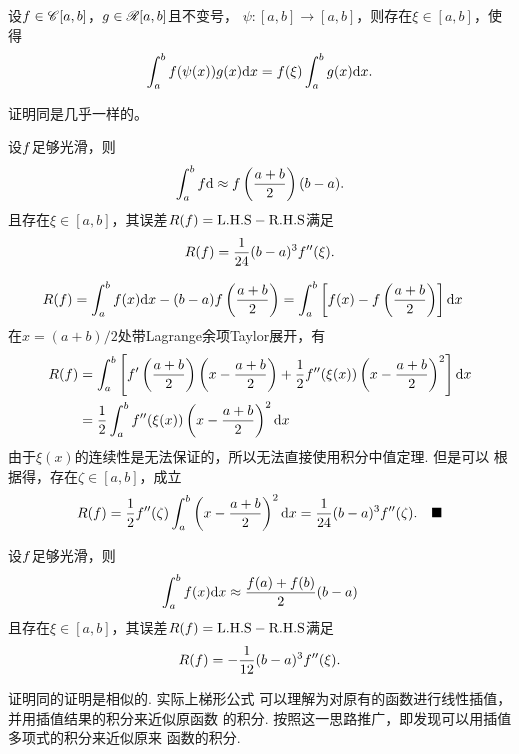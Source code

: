   \begin{pos}
    \label{pos: 积分第一中值定理2}
    设$\mathnormal{f}\in\mathscr{C}[a, b]$，$\mathnormal{g}\in\mathscr{R}[a, b]$且不变号，
    $\psi:[a, b]\to[a, b]$，则存在$\xi\in[a, b]$，使得
    \[
      \int_a^b\mathnormal{f}(\psi(x))\mathnormal{g}(x)\mathrm{d} x =
      \mathnormal{f}(\xi)\int_a^b\mathnormal{g}(x)\mathrm{d} x.
    \]
  \end{pos}
  \remark
    证明同是几乎一样的。

  \begin{pos}[中矩形公式]
    \label{pos: 中矩形公式}
    设$\mathnormal{f}$足够光滑，则
    \[
      \int_a^b\mathnormal{f}\mathrm{d} \approx \mathnormal{f}\left(\frac{a+b}{2}\right)(b-a).
    \]
    且存在$\xi\in[a, b]$，其误差$R(\mathnormal{f})=\text{L.H.S}-\text{R.H.S}$满足
    \[
      R(\mathnormal{f}) = \frac{1}{24}(b-a)^3\mathnormal{f}^{\prime\prime}(\xi).
    \]
  \end{pos}
  \proof
    \[\begin{split}
      R(\mathnormal{f}) &= \int_a^b\mathnormal{f}(x)\mathrm{d} x - (b-a)\mathnormal{f}\left( \frac{a+b}{2} \right) = \int_a^b \left[
        \mathnormal{f}(x) - \mathnormal{f}\left(\frac{a+b}{2}\right)
      \right]\mathrm{d} x
    \end{split}\]
    在$x = (a+b)/2$处带Lagrange余项Taylor展开，有
    \[\begin{split}
      R(\mathnormal{f}) &= \int_a^b\left[ \mathnormal{f}^\prime\left(\frac{a+b}{2}\right)\left(x - \frac{a+b}{2}\right)
       + \frac{1}{2}\mathnormal{f}^{\prime\prime}(\xi(x))\left(x - \frac{a+b}{2}\right)^2\right]\mathrm{d} x \\
       &= \frac{1}{2}\int_a^b\mathnormal{f}^{\prime\prime}(\xi(x))\left(x - \frac{a+b}{2}\right)^2\mathrm{d} x
    \end{split}\]
    由于$\xi(x)$的连续性是无法保证的，所以无法直接使用积分中值定理. 但是可以
    根据得，存在$\zeta\in[a, b]$，成立
    \[
      R(\mathnormal{f}) = \frac{1}{2}\mathnormal{f}^{\prime\prime}(\zeta)\int_a^b\left( x-\frac{a+b}{2} \right)^2\mathrm{d} x
      = \frac{1}{24}(b-a)^3\mathnormal{f}^{\prime\prime}(\zeta).\quad\blacksquare
    \]

  \begin{pos}[梯形公式]
    设$\mathnormal{f}$足够光滑，则
    \[
      \int_a^b\mathnormal{f}(x)\mathrm{d} x \approx \frac{\mathnormal{f}(a)+\mathnormal{f}(b)}{2}(b-a)
    \]
    且存在$\xi\in[a, b]$，其误差$R(\mathnormal{f})=\text{L.H.S}-\text{R.H.S}$满足
    \[
      R(\mathnormal{f}) = -\frac{1}{12}(b-a)^3\mathnormal{f}^{\prime\prime}(\xi).
    \]
  \end{pos}
  \remark
    证明同的证明是相似的. 实际上梯形公式
    可以理解为对原有的函数进行线性插值，并用插值结果的积分来近似原函数
    的积分. 按照这一思路推广，即发现可以用插值多项式的积分来近似原来
    函数的积分.

